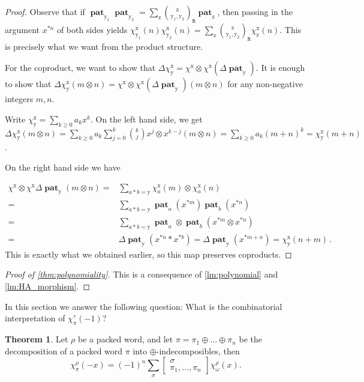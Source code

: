 \documentclass[12pt, reqno]{amsart}
\theoremstyle{definition}
\newtheorem{thm}{Theorem}[section]
\DeclareMathOperator{\pat}{\mathbf{pat}}
\newcommand{\xx}{\mathrm{x}}
\newcommand{\yy}{\mathrm{y}}
\newcommand{\zz}{\mathrm{z}}
\begin{document}
\begin{proof}
   Observe that if $\pat_{\yy_1} \pat_{\yy_2} = \sum_{\zz} \binom{\zz}{\yy_1, \yy_2}_{\mathtt{R}} \pat_{\zz}$, then passing in the argument $x^{\ast n}$ of both sides yields $\chi^{\xx}_{\yy_1}(n) \chi^{\xx}_{\yy_2}(n) = \sum_{\zz} \binom{\zz}{\yy_1, \yy_2}_{\mathtt{R}} \chi^{\xx}_{\zz}(n)  $.
    This is precisely what we want from the product structure.

    For the coproduct, we want to show that $\Delta \chi^{\xx}_{\yy} = \chi^{\xx} \otimes \chi^{\xx}(\Delta \pat_{\yy})$.
    It is enough to show that $\Delta \chi^{\xx}_{\yy} (m \otimes n) = \chi^{\xx} \otimes \chi^{\xx}(\Delta \pat_{\yy})(m\otimes n) $ for any non-negative integers $m, n$.

    Write $\chi^{\xx}_{\yy} = \sum_{k\geq 0 } a_k x^k$.
    On the left hand side, we get $\Delta \chi^{\xx}_{\yy} (m \otimes n) = \sum_{k \geq 0} a_k \sum_{j=0}^k \binom{k}{j} x^j\otimes x^{k-j} (m \otimes n) = \sum_{k \geq 0} a_k (m+n)^k = \chi^{\xx}_{\yy}(m+n) $.

    On the right hand side we have 
    
    
    \begin{equation*}
        \begin{split}
        \chi^{\xx} \otimes \chi^{\xx}\Delta \pat_{\yy}(m\otimes n) =& \sum_{a \ast b = \yy} \chi^{\xx}_a(m) \otimes \chi^{\xx}_a(n)\\
        =& \sum_{a \ast b = \yy} \pat_a(x^{\ast m})\pat_b(x^{\ast n})\\
        =& \sum_{a \ast b = \yy} \pat_a\otimes \pat_b ( x^{\ast m} \otimes x^{\ast n})\\
        =& \Delta \pat_{\yy}(x^{\ast n} \ast x^{\ast b}) = \Delta \pat_{\yy}(x^{\ast m+n}) = \chi^{\xx}_{\yy}(n+m)\, .
        \end{split}
    \end{equation*}
    This is exactly what we obtained earlier, so this map preserves coproducts.
\end{proof}


\begin{proof}[Proof of \cref{thm:polynomiality}]
This is a consequence of \cref{lm:polynomial} and \cref{lm:HA_morphism}.
\end{proof}


In this section we answer the following question:
What is the combinatorial interpretation of $\chi^{\tau}_{\pi}(-1)$?


\begin{thm}
Let $\rho$ be a packed word, and let $\pi = \pi_1 \oplus\dots \oplus \pi_n$ be the decomposition of a packed word $\pi$ into $\oplus$-indecomposibles, then
    $$\chi^{\rho}_{\pi}(-x) = (-1)^n \sum_{\sigma}
    \begin{bmatrix}
    \sigma \\ \pi_1, \dots, \pi_n
    \end{bmatrix}
     \chi^{\rho}_{\omega}(x).$$
\end{thm}
\end{document}
